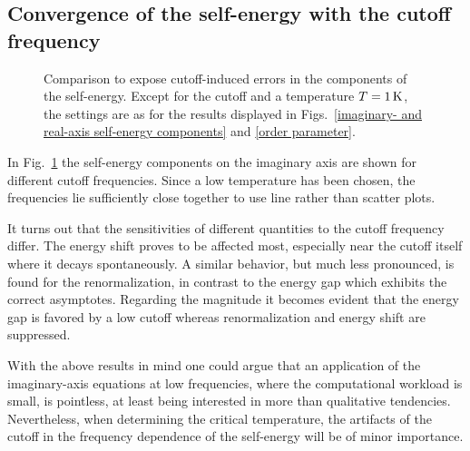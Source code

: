 \subsection{Convergence of the self-energy with the cutoff frequency}

\begin{figure}
    \small
    \begin{minipage}{4.666cm}
        
    \end{minipage}%
    \begin{minipage}{4.666cm}
        
    \end{minipage}%
    \begin{minipage}{4.666cm}
        
    \end{minipage}%
    \caption[Cutoff-induced errors of the self-energy]{
        Comparison to expose cutoff-induced errors in the components of the
        self-energy. Except for the cutoff and a temperature $T = 1 \, \mathrm K$,
        the settings are as for the results displayed in Figs.~\ref{imaginary-
        and real-axis self-energy components} and \ref{order parameter}.}
    \label{cutoff dependence of the self-energy}
\end{figure}
%
In Fig.~\ref{cutoff dependence of the self-energy} the self-energy components
on the imaginary axis are shown for different cutoff frequencies. Since a low
temperature has been chosen, the  frequencies lie sufficiently
close together to use line rather than scatter plots.

It turns out that the sensitivities of different quantities to the cutoff
frequency differ. The energy shift proves to be affected most, especially near
the cutoff itself where it decays spontaneously. A similar behavior, but much
less pronounced, is found for the renormalization, in contrast to the energy gap
which exhibits the correct asymptotes. Regarding the magnitude it becomes
evident that the energy gap is favored by a low cutoff whereas renormalization
and energy shift are suppressed.

With the above results in mind one could argue that an application of the
imaginary-axis  equations at low frequencies, where the
computational workload is small, is pointless, at least being interested in more
than qualitative tendencies. Nevertheless, when determining the critical
temperature, the artifacts of the cutoff in the frequency dependence of the
self-energy will be of minor importance.

